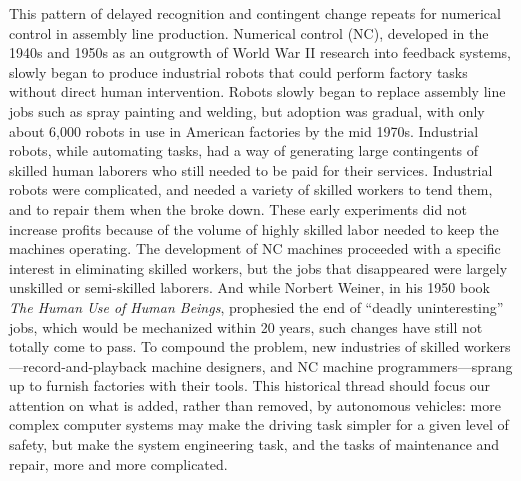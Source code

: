 This pattern of delayed recognition and contingent change repeats for
numerical control in assembly line production. Numerical control (NC),
developed in the 1940s and 1950s as an outgrowth of World War II
research into feedback systems, slowly began to produce industrial
robots that could perform factory tasks without direct human
intervention. Robots slowly began to replace assembly line jobs such
as spray painting and welding, but adoption was gradual, with only
about 6,000 robots in use in American factories by the mid
1970s.\cite[p. 159]{nyeAmericas} Industrial robots, while automating tasks,
had a way of generating large contingents of skilled human laborers
who still needed to be paid for their services. Industrial robots were
complicated, and needed a variety of skilled workers to tend them, and
to repair them when the broke down. These early experiments did not
increase profits because of the volume of highly skilled labor needed
to keep the machines operating.\cite[p. 162]{nyeAmericas} The development of NC machines
proceeded with a specific interest in eliminating skilled workers, but
the jobs that disappeared were largely unskilled or semi-skilled
laborers.\cite[p. 164]{nyeAmericas} And while Norbert Weiner, in his 1950 book \emph{The Human Use of
Human Beings}, prophesied the end of ``deadly uninteresting'' jobs, which
would be mechanized within 20 years, such changes have still not
totally come to pass.\cite[p. 161]{nyeAmericas} To compound the problem, new industries of
skilled workers---record-and-playback machine designers, and NC machine
programmers---sprang up to furnish factories with their tools. This
historical thread should focus our attention on what is added, rather
than removed, by
autonomous vehicles: more complex computer systems may make the driving
task simpler for a given level of safety, but make the system
engineering task, and the tasks of maintenance and repair, more and more complicated.

